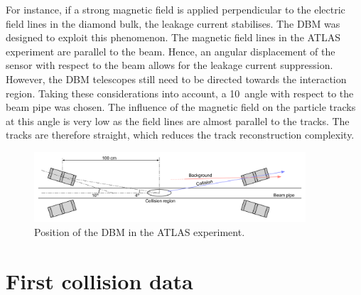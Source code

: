 For instance, if a strong magnetic field is applied perpendicular to the electric field lines in the diamond bulk, the leakage current stabilises. The DBM was designed to exploit this phenomenon. The magnetic field lines in the ATLAS experiment are parallel to the beam. Hence, an angular displacement of the sensor with respect to the beam allows for the leakage current suppression. However, the DBM telescopes still need to be directed towards the interaction region. Taking these considerations into account, a 10\textdegree~angle with respect to the beam pipe was chosen. The influence of the magnetic field on the particle tracks at this angle is very low as the field lines are almost parallel to the tracks. The tracks are therefore straight, which reduces the track reconstruction complexity.

\begin{figure}[!t]
\centering
\includegraphics[width=0.9\textwidth]{04_charge_monitoring/pics/positioning}
\caption{Position of the DBM in the ATLAS experiment.}
\label{fig:dbminatlas}
\end{figure}



\clearpage
\section{First collision data}
\label{sec:operation}


